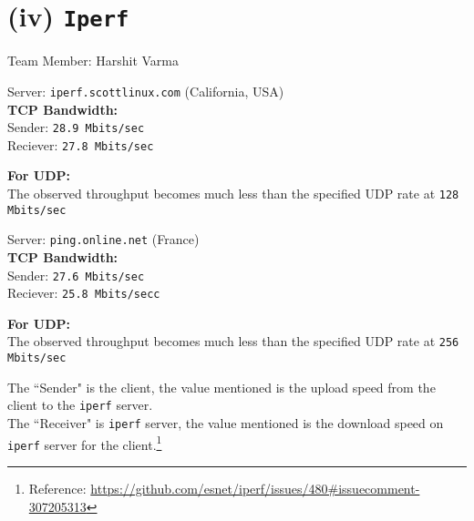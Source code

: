 \documentclass[11pt, fleqn]{article}
\begin{document}
\newpage
\section*{(iv) \texttt{Iperf}}
\label{partd}
\setcounter{equation}{0}

Team Member: Harshit Varma

\hrulefill
\smallskip


Server: \texttt{iperf.scottlinux.com} (California, USA)\\
\textbf{TCP Bandwidth:}\\
Sender: \texttt{28.9 Mbits/sec}\\
Reciever: \texttt{27.8 Mbits/sec}

\textbf{For UDP:}\\
The observed throughput becomes much less than the specified UDP rate at \texttt{128 Mbits/sec}

\hrulefill
\medskip

Server: \texttt{ping.online.net} (France)\\
\textbf{TCP Bandwidth:}\\
Sender: \texttt{27.6 Mbits/sec}\\
Reciever: \texttt{25.8 Mbits/secc}

\textbf{For UDP:}\\
The observed throughput becomes much less than the specified UDP rate at \texttt{256 Mbits/sec}

\hrulefill
\medskip


The ``Sender" is the client, the value mentioned is the upload speed from the client to the \texttt{iperf} server.\\
The ``Receiver" is \texttt{iperf} server, the value mentioned is the download speed on \texttt{iperf} server for the client.\footnote{Reference: \url{https://github.com/esnet/iperf/issues/480#issuecomment-307205313}}

\medskip
\end{document}
